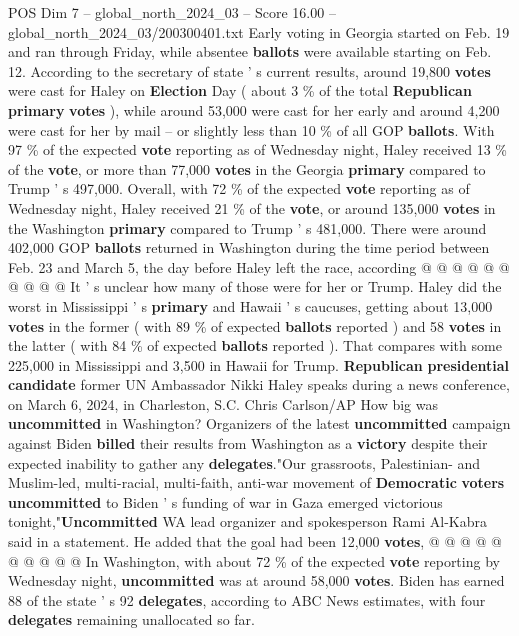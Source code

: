 \begin{textsample}{POS Dim 7 – global\_north\_2024\_03 – Score 16.00 – global\_north\_2024\_03/200300401.txt}
Early voting in Georgia started on Feb. 19 and ran through Friday, while absentee \textbf{ballots} were available starting on Feb. 12.
According to the secretary of state ' s current results, around 19,800 \textbf{votes} were cast for Haley on \textbf{Election} Day ( about 3 \% of the total \textbf{Republican} \textbf{primary} \textbf{votes} ), while around 53,000 were cast for her early and around 4,200 were cast for her by mail -- or slightly less than 10 \% of all GOP \textbf{ballots}.
With 97 \% of the expected \textbf{vote} reporting as of Wednesday night, Haley received 13 \% of the \textbf{vote}, or more than 77,000 \textbf{votes} in the Georgia \textbf{primary} compared to Trump ' s 497,000.
Overall, with 72 \% of the expected \textbf{vote} reporting as of Wednesday night, Haley received 21 \% of the \textbf{vote}, or around 135,000 \textbf{votes} in the Washington \textbf{primary} compared to Trump ' s 481,000.
There were around 402,000 GOP \textbf{ballots} returned in Washington during the time period between Feb. 23 and March 5, the day before Haley left the race, according @ @ @ @ @ @ @ @ @ @ It ' s unclear how many of those were for her or Trump.
Haley did the worst in Mississippi ' s \textbf{primary} and Hawaii ' s caucuses, getting about 13,000 \textbf{votes} in the former ( with 89 \% of expected \textbf{ballots} reported ) and 58 \textbf{votes} in the latter ( with 84 \% of expected \textbf{ballots} reported ).
That compares with some 225,000 in Mississippi and 3,500 in Hawaii for Trump. \textbf{Republican} \textbf{presidential} \textbf{candidate} former UN Ambassador Nikki Haley speaks during a news conference, on March 6, 2024, in Charleston, S.C.
Chris Carlson/AP How big was \textbf{uncommitted} in Washington?
Organizers of the latest \textbf{uncommitted} campaign against Biden \textbf{billed} their results from Washington as a \textbf{victory} despite their expected inability to gather any \textbf{delegates}."Our grassroots, Palestinian- and Muslim-led, multi-racial, multi-faith, anti-war movement of \textbf{Democratic} \textbf{voters} \textbf{uncommitted} to Biden ' s funding of war in Gaza emerged victorious tonight,"\textbf{Uncommitted} WA lead organizer and spokesperson Rami Al-Kabra said in a statement.
He added that the goal had been 12,000 \textbf{votes}, @ @ @ @ @ @ @ @ @ @ In Washington, with about 72 \% of the expected \textbf{vote} reporting by Wednesday night, \textbf{uncommitted} was at around 58,000 \textbf{votes}.
Biden has earned 88 of the state ' s 92 \textbf{delegates}, according to ABC News estimates, with four \textbf{delegates} remaining unallocated so far.

\end{textsample}
